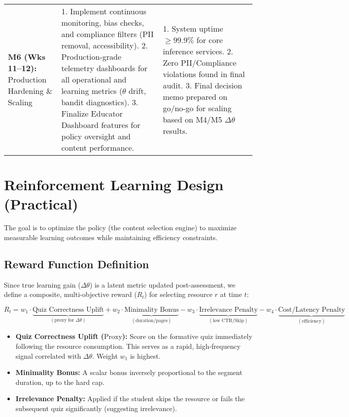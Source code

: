 \documentclass[12pt]{article}
\begin{document}
\begin{enumerate}
\begin{longtable}{p{2.5cm}p{6.5cm}p{4.0cm}}
\textbf{M6 (Wks 11–12):} Production Hardening \& Scaling &
1. Implement continuous monitoring, bias checks, and compliance filters (PII removal, accessibility).
2. Production-grade telemetry dashboards for all operational and learning metrics ($\theta$ drift, bandit diagnostics).
3. Finalize Educator Dashboard features for policy oversight and content performance. &
1. System uptime $\ge 99.9\%$ for core inference services.
2. Zero PII/Compliance violations found in final audit.
3. Final decision memo prepared on go/no-go for scaling based on M4/M5 $\Delta\theta$ results. \\
\end{longtable}

\section{Reinforcement Learning Design (Practical)}

The goal is to optimize the policy (the content selection engine) to maximize measurable learning outcomes while maintaining efficiency constraints.

\subsection{Reward Function Definition}
Since true learning gain ($\Delta\theta$) is a latent metric updated post-assessment, we define a composite, multi-objective reward ($R_t$) for selecting resource $r$ at time $t$:

$$R_t = w_1 \cdot \underbrace{\text{Quiz Correctness Uplift}}_{(\text{proxy for } \Delta\theta)} + w_2 \cdot \underbrace{\text{Minimality Bonus}}_{(\text{duration/pages})} - w_3 \cdot \underbrace{\text{Irrelevance Penalty}}_{(\text{low CTR/Skip})} - w_4 \cdot \underbrace{\text{Cost/Latency Penalty}}_{(\text{efficiency})}$$

\begin{itemize}[noitemsep]
    \item \textbf{Quiz Correctness Uplift ($\text{Proxy}$):} Score on the formative quiz immediately following the resource consumption. This serves as a rapid, high-frequency signal correlated with $\Delta\theta$. Weight $w_1$ is highest.
    \item \textbf{Minimality Bonus:} A scalar bonus inversely proportional to the segment duration, up to the hard cap.
    \item \textbf{Irrelevance Penalty:} Applied if the student skips the resource or fails the subsequent quiz significantly (suggesting irrelevance).
\end{itemize}


\end{enumerate}
\end{document}
